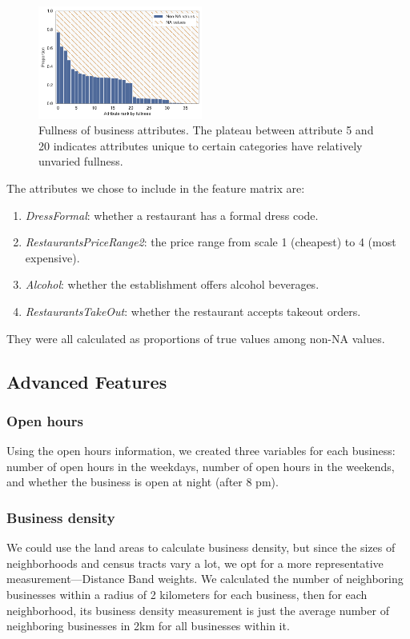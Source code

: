 \documentclass[compsoc]{IEEEtran}
\let\MYoriglatexcaption\caption
\renewcommand{\caption}[2][\relax]{\MYoriglatexcaption[#2]{#2}}
\begin{document}
\begin{figure}[h]
  \hspace{-.5em}
    \includegraphics[width=0.48\textwidth]{attributes}
  \caption{Fullness of business attributes. The plateau between attribute 5 and 20 indicates attributes unique to certain categories have relatively unvaried fullness.}
  \label{attributes}
\end{figure}

The attributes we chose to include in the feature matrix are:
\begin{enumerate}
	\item \textit{DressFormal}: whether a restaurant has a formal dress code.
	\item \textit{RestaurantsPriceRange2}: the price range from scale 1 (cheapest) to 4 (most expensive).
	\item \textit{Alcohol}: whether the establishment offers alcohol beverages.
	\item \textit{RestaurantsTakeOut}: whether the restaurant accepts takeout orders.
\end{enumerate}

They were all calculated as proportions of true values among non-NA values.

\subsection{Advanced Features}

\subsubsection{Open hours}

Using the open hours information, we created three variables for each business: number of open hours  in the weekdays, number of open hours in the weekends, and whether the business is open at night (after 8 pm).

\subsubsection{Business density} We could use the land areas to calculate business density, but since the sizes of neighborhoods and census tracts vary a lot, we opt for a more representative measurement---Distance Band weights. We calculated the number of neighboring businesses within a radius of 2 kilometers for each business, then for each neighborhood, its business density measurement is just the average number of neighboring businesses in 2km for all businesses within it.
\end{document}
